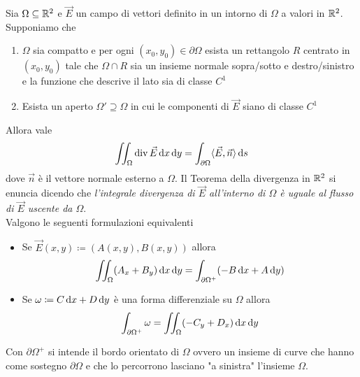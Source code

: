 \begin{thm} \label{thm:teodiv}
	Sia $ \Omega \subseteq \mathbb{R}^2 $ e $ \vec{E} $ un campo di vettori definito in un intorno di $ \Omega $ a valori in $ \mathbb{R}^2 $. Supponiamo che 
	\begin{enumerate}[label = (\roman*)]
		\item $ \Omega $ sia compatto e per ogni $ (x_0, y_0) \in \partial \Omega $ esista un rettangolo $ R $ centrato in $ (x_0, y_0) $ tale che $ \Omega \cap R $ sia un insieme normale sopra/sotto e destro/sinistro e la funzione che descrive il lato sia di classe $ C^1 $
		\item Esista un aperto $ \Omega' \supseteq \Omega $ in cui le componenti di $ \vec{E} $ siano di classe $ C^1 $
	\end{enumerate}
	Allora vale
	\begin{equation}
		\iint_{\Omega} \div{\vec{E}} \dif{x} \dif{y} = \int_{\partial \Omega} \langle {\vec{E}, \vec{n}} \rangle \dif{s}
	\end{equation}
	dove $ \vec{n} $ è il vettore normale esterno a $ \Omega $. Il Teorema della divergenza in $ \mathbb{R}^2 $ si enuncia dicendo che \emph{l'integrale divergenza di $ \vec{E} $ all'interno di $ \Omega $ è uguale al flusso di $ \vec{E} $ uscente da $ \Omega $}. \\
	Valgono le seguenti formulazioni equivalenti
	\begin{itemize}
		\item Se $ \vec{E}(x, y) \coloneqq (A(x, y), B(x, y)) $ allora 
		\begin{equation} \label{eq:div_forma}
			\iint_{\Omega} (A_x + B_y) \dif{x} \dif{y} = \int_{\partial \Omega^{+}} (-B \dif{x} + A \dif{y})
		\end{equation}
		\item Se $ \omega \coloneqq C \dif{x} + D \dif{y} $ è una forma differenziale su $ \Omega $ allora
		\begin{equation}
			\int_{\partial \Omega^+} \omega = \iint_{\Omega} (-C_y + D_x) \dif{x} \dif{y}
		\end{equation}
	\end{itemize}
	Con $ \partial \Omega^+ $ si intende il bordo orientato di $ \Omega $ ovvero un insieme di curve che hanno come sostegno $ \partial \Omega $ e che lo percorrono lasciano "a sinistra" l'insieme $ \Omega $. 
\end{thm}
%
